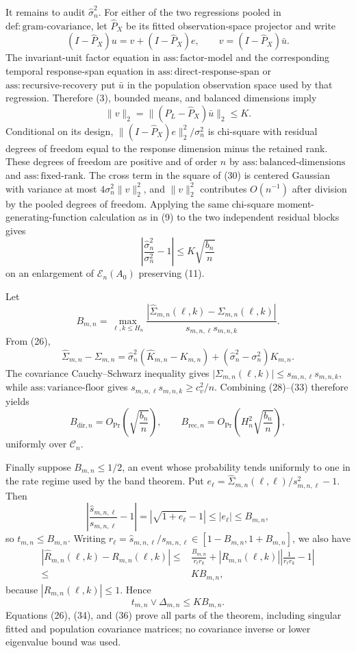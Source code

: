 It remains to audit \(\widehat\sigma_n^2\).  For either of the two regressions pooled in \(\mathrm{def{:}gram\mbox{-}covariance}\), let \(\widehat P_X\) be its fitted observation-space projector and write
\[
 (I-\widehat P_X)u=v+(I-\widehat P_X)e,\qquad
 v=(I-\widehat P_X)\bar u.
 \tag{30}
\]
The invariant-unit factor equation in \(\mathrm{ass{:}factor\mbox{-}model}\) and the corresponding temporal response-span equation in \(\mathrm{ass{:}direct\mbox{-}response\mbox{-}span}\) or \(\mathrm{ass{:}recursive\mbox{-}recovery}\) put \(\bar u\) in the population observation space used by that regression.  Therefore (3), bounded means, and balanced dimensions imply
\[
 \|v\|_2=\|(P_L-\widehat P_X)\bar u\|_2\le K.
 \tag{31}
\]
Conditional on its design, \(\|(I-\widehat P_X)e\|_2^2/\sigma_n^2\) is chi-square with residual degrees of freedom equal to the response dimension minus the retained rank.  These degrees of freedom are positive and of order \(n\) by \(\mathrm{ass{:}balanced\mbox{-}dimensions}\) and \(\mathrm{ass{:}fixed\mbox{-}rank}\).  The cross term in the square of (30) is centered Gaussian with variance at most \(4\sigma_n^2\|v\|_2^2\), and \(\|v\|_2^2\) contributes \(O(n^{-1})\) after division by the pooled degrees of freedom.  Applying the same chi-square moment-generating-function calculation as in (9) to the two independent residual blocks gives
\[
 \left|\frac{\widehat\sigma_n^2}{\sigma_n^2}-1\right|
 \le K\sqrt{\frac{b_n}{n}}
 \tag{32}
\]
on an enlargement of \(\mathcal E_n(A_0)\) preserving (11).

Let
\[
 B_{m,n}=\max_{\ell,k\le H_n}
 \frac{|\widehat\Sigma_{m,n}(\ell,k)-\Sigma_{m,n}(\ell,k)|}
 {s_{m,n,\ell}s_{m,n,k}}.
\]
From (26),
\[
 \widehat\Sigma_{m,n}-\Sigma_{m,n}
 =\widehat\sigma_n^2(\widehat K_{m,n}-K_{m,n})
   +(\widehat\sigma_n^2-\sigma_n^2)K_{m,n}.
 \tag{33}
\]
The covariance Cauchy--Schwarz inequality gives
\(\lvert\Sigma_{m,n}(\ell,k)\rvert\le s_{m,n,\ell}s_{m,n,k}\), while \(\mathrm{ass{:}variance\mbox{-}floor}\) gives
\(s_{m,n,\ell}s_{m,n,k}\ge c_v^2/n\).  Combining (28)--(33) therefore yields
\[
 B_{\mathrm{dir},n}=O_{\Pr}\!\left(\sqrt{\frac{b_n}{n}}\right),\qquad
 B_{\mathrm{rec},n}=O_{\Pr}\!\left(H_n^2\sqrt{\frac{b_n}{n}}\right),
 \tag{34}
\]
uniformly over \(\mathcal C_n\).

Finally suppose \(B_{m,n}\le1/2\), an event whose probability tends uniformly to one in the rate regime used by the band theorem.  Put
\(e_\ell=\widehat\Sigma_{m,n}(\ell,\ell)/s_{m,n,\ell}^2-1\).  Then
\[
 \left|\frac{\widehat s_{m,n,\ell}}{s_{m,n,\ell}}-1\right|
 =|\sqrt{1+e_\ell}-1|\le|e_\ell|\le B_{m,n},
\]
so \(t_{m,n}\le B_{m,n}\).  Writing \(r_\ell=\widehat s_{m,n,\ell}/s_{m,n,\ell}\in[1-B_{m,n},1+B_{m,n}]\), we also have
\[
\begin{aligned}
 |\widehat R_{m,n}(\ell,k)-R_{m,n}(\ell,k)|
 \le{}&\frac{B_{m,n}}{r_\ell r_k}
 +|R_{m,n}(\ell,k)|\left|\frac1{r_\ell r_k}-1\right|\\
 \le{}&K B_{m,n},
\end{aligned}
 \tag{35}
\]
because \(|R_{m,n}(\ell,k)|\le1\).  Hence
\[
 t_{m,n}\vee\Delta_{m,n}\le K B_{m,n}.
 \tag{36}
\]
Equations (26), (34), and (36) prove all parts of the theorem, including singular fitted and population covariance matrices; no covariance inverse or lower eigenvalue bound was used.

